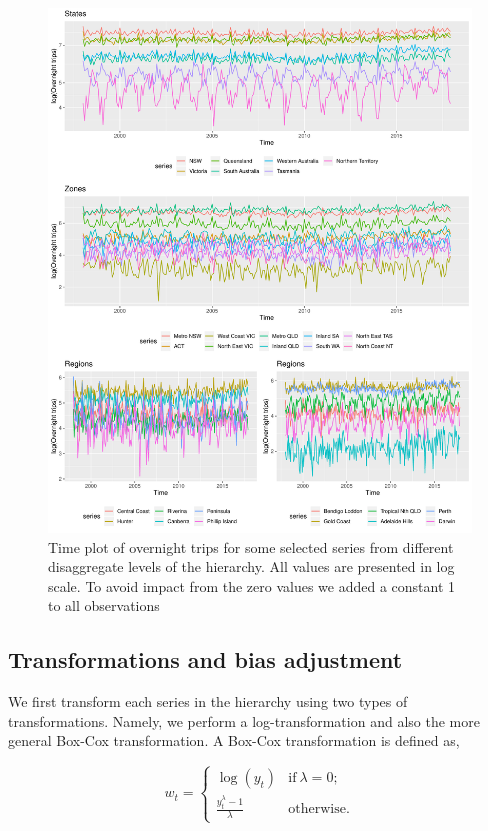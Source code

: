 \documentclass[12pt]{article}
\theoremstyle{definition}
\theoremstyle{property}
\begin{document}
\begin{figure}
		\centering
		\small
		\includegraphics[width= \textwidth]{Empirical-results/TS-plots/States_Zones_Regs_TSplots1.pdf}
		\caption{Time plot of overnight trips for some selected series from different disaggregate levels of the hierarchy. All values are presented in log scale. To avoid impact from the zero values we added a constant 1 to all observations}\label{fig:States_Zones_Regs_TSplots}
\end{figure}

\clearpage
	\subsection{Transformations and bias adjustment}
	
	We first transform each series in the hierarchy using two types of transformations. Namely, we perform a log-transformation and also the more general Box-Cox transformation. A Box-Cox transformation is defined as,
		
\begin{equation} \label{eq:BoxCox_transformation}
	w_t =
	\begin{cases}
	\log(y_t) & \text{if}~\lambda=0;\\
	\frac{y_t^\lambda - 1}{\lambda}  & \text{otherwise}.
	\end{cases}
\end{equation}
\end{document}
